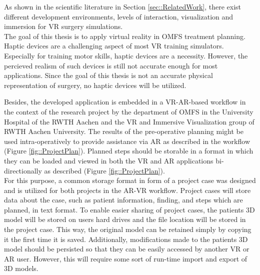 As shown in the scientific literature in Section \ref{sec::RelatedWork}, there exist different development environments, levels of interaction, visualization and immersion for VR surgery simulations.
\\ The goal of this thesis is to apply virtual reality in OMFS treatment planning.
Haptic devices are a challenging aspect of most VR training simulators.
Especially for training motor skills, haptic devices are a necessity.
However, the percieved realism of such devices is still not accurate enough for most applications.
Since the goal of this thesis is not an accurate physical representation of surgery, no haptic devices will be utilized.

Besides, the developed application is embedded in a VR-AR-based workflow in the context of the research project by the department of OMFS in the University 
Hospital of the RWTH Aachen and the VR and Immersive Visualization group of RWTH Aachen University.
The results of the pre-operative planning might be used intra-operatively to provide assistance via AR as described in the workflow (Figure \ref{fig::ProjectPlan}).
Planned steps should be storable in a format in which they can be loaded and viewed in both the VR and AR applications bi-directionally as described (Figure \ref{fig::ProjectPlan}).
\\ For this purpose, a common storage format in form of a project case was designed and is utilized for both projects in the AR-VR workflow.
Project cases will store data about the case, such as patient information, finding, and steps which are planned, in text format.
To enable easier sharing of project cases, the patients 3D model will be stored on users hard drives and the file location will be stored in the project case. 
This way, the original model can be retained simply by copying it the first time it is saved.
Additionally, modifications made to the patients 3D model should be persisted so that they can be easily accessed by another VR or AR user. 
However, this will require some sort of run-time import and export of 3D models.

